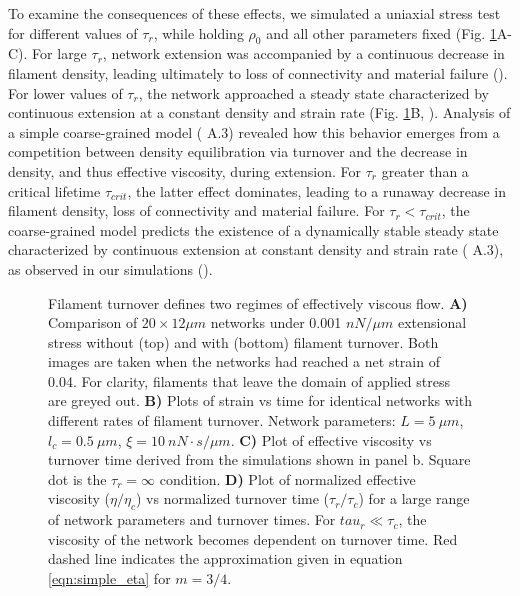 \documentclass[10pt,letterpaper]{article}
\begin{document}
To examine the consequences of these effects, we simulated a uniaxial stress test for different values of $\tau_r$, while holding $\rho_0$ and all other parameters fixed (Fig. \ref{fig:passive_rec}A-C). For large $\tau_r$, network extension was accompanied by a continuous decrease in filament density, leading ultimately to loss of connectivity and material failure ().  For lower values of $\tau_r$, the network approached a steady state characterized by continuous extension at a constant density and strain rate (Fig. \ref{fig:passive_rec}B, ).  Analysis of a simple coarse-grained model ( A.3) revealed how this behavior emerges from a competition between density equilibration via turnover and the decrease in density, and thus effective viscosity, during extension. For $\tau_r$ greater than a critical lifetime $\tau_{crit}$, the latter effect dominates, leading to a runaway decrease in filament density, loss of connectivity and material failure. For $\tau_r < \tau_{crit}$, the coarse-grained model predicts the existence of a dynamically stable steady state characterized by continuous extension at constant density and strain rate ( A.3), as observed in our simulations (). 



\begin{figure}[h!]
	\centering
	\caption{\label{fig:passive_rec}  Filament turnover defines two regimes of effectively viscous flow. \textbf{A)} Comparison of $20 \times 12 \mu m$ networks under 0.001 $nN/\mu m$ extensional stress without (top) and with (bottom) filament turnover.  Both images are taken when the networks had reached a net strain of 0.04.  For clarity, filaments that leave the domain of applied stress are greyed out. \textbf{B)} Plots of strain vs time for identical networks with different rates of filament turnover.  Network parameters: $L=5\: \mu m$, $l_c=0.5\: \mu m$, $\xi=10\: nN\cdot s/\mu m$. \textbf{C)}  Plot of effective viscosity vs turnover time derived from the simulations shown in panel b.  Square dot is the $\tau_r=\infty$ condition.  \textbf{D)} Plot of normalized effective viscosity ($\eta/\eta_c$) vs normalized turnover time ($\tau_r/\tau_c$) for a large range of network parameters and turnover times. For $tau_r \ll \tau_c$, the viscosity of the network becomes dependent on turnover time. Red dashed line indicates the approximation given in equation \ref{eqn:simple_eta} for $m=3/4$.}
\end{figure}
\end{document}
